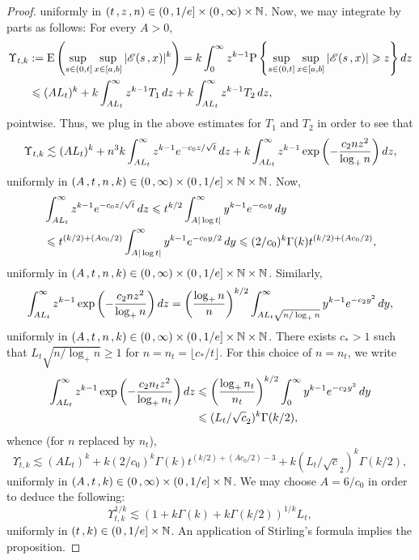 \documentclass[10pt,a4paper]{amsart}
\newcommand{\E}{\mathrm{E}}
\newcommand{\N}{\mathbb{N}}
\newcommand{\e}{{\rm e}}
\renewcommand{\P}{\mathrm{P}}
\renewcommand{\d}{{\rm d}}
\renewcommand{\ge}{\geqslant}
\renewcommand{\le}{\leqslant}
\begin{document}
\begin{proof}
	uniformly in $(t\,,z\,,n)\in(0\,,1/\e]\times(0\,,\infty)\times\N$.
	Now, we may integrate
	by parts as follows: For every $A>0$,
	\begin{align*}
		\Upsilon_{t,k} &:= \E\left(\adjustlimits\sup_{s\in(0,t]}
			\sup_{x\in[a,b]} |\mathscr{E}(s\,,x)|^k\right) =
			k\int_0^\infty z^{k-1}\P\left\{ \sup_{s\in (0,t]}
			\sup_{x\in [a,b]} |\mathscr{E}(s\,,x)| \ge z\right\} \d z\\
		&\le (AL_t)^k + 
			k\int_{AL_t}^\infty z^{k-1} T_1 \,\d z
			+ k\int_{AL_t}^\infty z^{k-1} T_2\,\d z,
	\end{align*}
	pointwise. Thus, we plug in the above estimates for $T_1$ and $T_2$
	in order to see that
	\[
		\Upsilon_{t,k} \lesssim (AL_t)^k
		+  n^3k\int_{AL_t}^\infty z^{k-1}\e^{-c_0z/\sqrt{t}}\,\d z
		+ k\int_{AL_t}^\infty z^{k-1}
		\exp\left( - \frac{c_2nz^2}{\log_+ n}\right)\d z,
	\]
	uniformly in $(A\,,t\,,n\,,k)\in(0\,,\infty)\times(0\,,1/\e]\times\N\times\N$.
	Now,
	\begin{align*}
		&\int_{AL_t}^\infty z^{k-1}\e^{-c_0z/\sqrt{t}}\,\d z
			\le t^{k/2} \int_{A|\log t|}^\infty y^{k-1}\e^{-c_0y}\,\d y\\
		&\le t^{(k/2)+(Ac_0/2)} \int_{A|\log t|}^\infty y^{k-1}\e^{-c_0y/2}\,\d y
			\le (2/c_0)^k\Gamma(k)t^{(k/2)+(Ac_0/2)},
	\end{align*}
	uniformly in $(A\,,t\,,n\,,k)\in(0\,,\infty)\times
	(0\,,1/\e]\times\N\times\N$.
	Similarly,
	\[
		\int_{AL_t}^\infty z^{k-1}
		\exp\left( - \frac{c_2nz^2}{\log_+ n}\right)\d z
		= \left( \frac{\log_+ n}{n}\right)^{k/2}
		\int_{AL_t \sqrt{n/\log_+n}}^\infty y^{k-1} \e^{-c_2y^2}\,\d y,
	\]
	uniformly in $(A\,,t\,,n\,,k)\in(0\,,\infty)\times
	(0\,,1/\e]\times\N\times\N$. There exists $c_*>1$
	such that $L_t \sqrt{n/\log_+n} \ge 1$ for $n= n_t = \lfloor c_*/t\rfloor.$
	For this choice of $n=n_t$, we write
	\begin{align*}
		\int_{AL_t}^\infty z^{k-1}
			\exp\left( - \frac{c_2n_t z^2}{\log_+ n_t}\right)\d z
			&\le \left( \frac{\log_+ n_t}{n_t}\right)^{k/2}
			\int_0^\infty y^{k-1} \e^{-c_2y^2}\,\d y\\
		& \le (L_t/ \sqrt c_2)^{k}\Gamma(k/2),
	\end{align*}
	whence (for $n$ replaced by $n_t$),
	\[
		\Upsilon_{t,k} \lesssim (AL_t)^k
		+  k(2/c_0)^k\Gamma(k)t^{(k/2)+(Ac_0/2) -3}
		+ k(L_t/\sqrt c_2)^k\Gamma(k/2),
	\]
	uniformly in $(A\,,t\,,k)\in(0\,,\infty)\times
	(0\,,1/\e]\times\N$. We may choose
	$A=6/c_0$ in order to deduce the following:
	\[
		\Upsilon_{t,k}^{1/k}
		\lesssim \left( 1
		+  k\Gamma(k)
		+ k\Gamma(k/2)\right)^{1/k} L_t,
	\]
	uniformly in $(t\,,k)\in(0\,,1/\e]\times\N$. 
	An application of Stirling's formula
	implies the proposition.
\end{proof}
\end{document}
